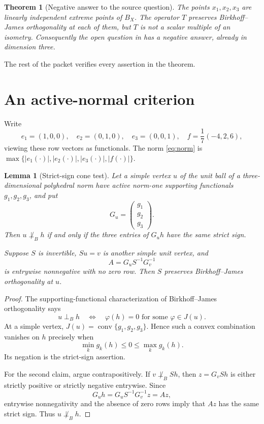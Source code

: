 \documentclass[11pt]{article}
\newtheorem{theorem}{Theorem}
\newtheorem{lemma}{Lemma}
\newcommand{\perpB}{\perp_{\!B}}
\begin{document}
\begin{theorem}[Negative answer to the source question]\label{thm:main}
The points $x_1,x_2,x_3$ are linearly independent extreme points of
$B_X$. The operator $T$ preserves Birkhoff--James orthogonality at each of
them, but $T$ is not a scalar multiple of an isometry. Consequently the open
question in \cite[p.~16]{MMPS} has a negative answer, already in dimension
three.
\end{theorem}

The rest of the packet verifies every assertion in the theorem.

\section{An active-normal criterion}

Write
\[
 e_1=(1,0,0),\quad e_2=(0,1,0),\quad e_3=(0,0,1),\quad
 f=\frac17(-4,2,6),
\]
viewing these row vectors as functionals. The norm \eqref{eq:norm} is
$\max\{|e_1(\cdot)|,|e_2(\cdot)|,|e_3(\cdot)|,|f(\cdot)|\}$.

\begin{lemma}[Strict-sign cone test]\label{lem:cone}
Let a simple vertex $u$ of the unit ball of a three-dimensional polyhedral
norm have active norm-one supporting functionals $g_1,g_2,g_3$, and put
\[
 G_u=\begin{pmatrix}g_1\\g_2\\g_3\end{pmatrix}.
\]
Then $u\not\perpB h$ if and only if the three entries of $G_uh$ have the
same strict sign.

Suppose $S$ is invertible, $Su=v$ is another simple unit vertex, and
\begin{equation}\label{eq:criterion}
 A=G_uS^{-1}G_v^{-1}
\end{equation}
is entrywise nonnegative with no zero row. Then $S$ preserves
Birkhoff--James orthogonality at $u$.
\end{lemma}

\begin{proof}
The supporting-functional characterization of Birkhoff--James
orthogonality says
\[
 u\perpB h\quad\Longleftrightarrow\quad
 \varphi(h)=0\text{ for some }\varphi\in J(u).
\]
At a simple vertex,
$J(u)=\operatorname{conv}\{g_1,g_2,g_3\}$. Hence such a convex combination
vanishes on $h$ precisely when
\[
 \min_k g_k(h)\le0\le\max_k g_k(h).
\]
Its negation is the strict-sign assertion.

For the second claim, argue contrapositively. If
$v\not\perpB Sh$, then $z=G_vSh$ is either strictly positive or strictly
negative entrywise. Since
\[
 G_uh=G_uS^{-1}G_v^{-1}z=Az,
\]
entrywise nonnegativity and the absence of zero rows imply that $Az$ has the
same strict sign. Thus $u\not\perpB h$.
\end{proof}
\end{document}

